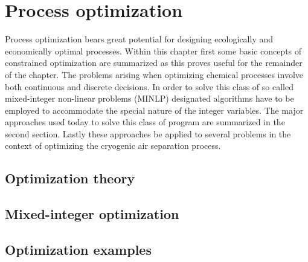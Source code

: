 \chapter{Process optimization}
\label{chp:optimization}
Process optimization bears great potential for designing ecologically and economically optimal processes. 
Within this chapter first some basic concepts of constrained optimization are summarized as this proves 
useful for the remainder of the chapter. The problems arising when optimizing chemical processes involve 
both continuous and discrete decisions. In order to solve this class of so called mixed-integer non-linear
problems (MINLP) designated algorithms have to be employed to accommodate the special nature of the integer 
variables. The major approaches used today to solve this class of program  are summarized in the second section. 
Lastly these approaches be applied to several problems in the context of optimizing the cryogenic air separation 
process.
 
    \section{Optimization theory}
    \label{sec:opt:theory}
    

    \section{Mixed-integer optimization}
    \label{sec:opt:MINLP}
    

    \section{Optimization examples}
    \label{sec:opt:apllication}
    

